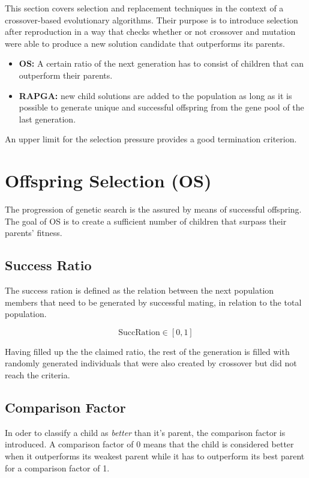 \documentclass[../main.tex]{subfiles}
\begin{document}
This section covers selection and replacement techniques in the context of a crossover-based evolutionary algorithms. Their purpose is to introduce selection after reproduction in a way that checks whether or not crossover and mutation were able to produce a new solution candidate that outperforms its parents.

\begin{itemize}
    \item \textbf{OS:} A certain ratio of the next generation has to consist of children that can outperform their parents.
    \item \textbf{RAPGA:} new child solutions are added to the population as long as it is possible to generate unique and successful offspring from the gene pool of the last generation.
\end{itemize}

An upper limit for the selection pressure provides a good termination criterion.

\section{Offspring Selection (OS)}

The progression of genetic search is the assured by means of successful offspring. The goal of OS is to create a sufficient number of children that surpass their parents' fitness.

\subsection{Success Ratio}
The success ration is defined as the relation between the next population members that need to be generated by successful mating, in relation to the total population.

\begin{equation}
    \text{SuccRation} \in [0,1]
\end{equation}

Having filled up the the claimed ratio, the rest of the generation is filled with randomly generated individuals that were also created by crossover but did not reach the criteria.

\subsection{Comparison Factor}
In oder to classify a child as \emph{better} than it's parent, the comparison factor is introduced. A comparison factor of 0 means that the child is considered better when it outperforms its weakest parent while it has to outperform its best parent for a comparison factor of 1.
\end{document}
